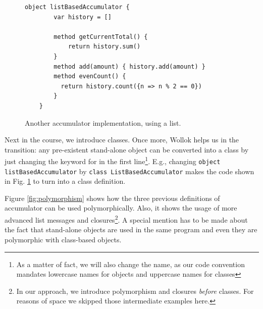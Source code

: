 \vspace{-3mm}
\begin{figure}[ht]
 \centering
 \begin{lstlisting}[language=Wollok]
	object listBasedAccumulator {
		var history = []
		
		method getCurrentTotal() {
			return history.sum()
		}
		method add(amount) { history.add(amount) }
		method evenCount() {
		  return history.count({n => n % 2 == 0})
		}
	}\end{lstlisting}
\vspace{-3mm}
 \caption{\small Another accumulator implementation, using a list.}
\vspace{-3mm}
 \label{fig:accumulator/list}
\end{figure}

\medskip
Next in the course, we introduce classes.
Once more, Wollok helps us in the transition: any pre-existent stand-alone object can be converted into a class by just changing the keyword  for  in the first line\footnote{As a matter of fact, we will also change the name, as our code convention mandates lowercase names for objects and uppercase names for classes}. E.g., changing \texttt{object listBasedAccumulator} by \texttt{class ListBasedAccumulator} makes the code shown in Fig. \ref{fig:accumulator/list} to turn into a class definition.



%
%
Figure \ref{fig:polymorphism} shows how the three previous definitions of accumulator can be used polymorphically. 
Also, it shows the usage of more advanced list messages and closures\footnote{In our approach, we introduce polymorphism and closures \emph{before} classes. For reasons of space we skipped those intermediate examples here.}.
A special mention has to be made about the fact that stand-alone objects are used in the same program and even they are polymorphic with class-based objects.

